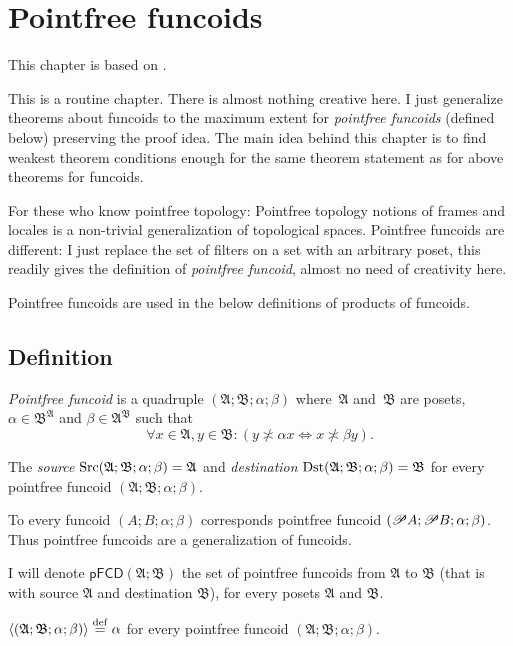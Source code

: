 
\chapter{\label{pf-funcoids}Pointfree funcoids}

This chapter is based on \cite{pointfree}.

This is a routine chapter. There is almost nothing creative here.
I just generalize theorems about funcoids to the maximum extent for
\emph{pointfree funcoids} (defined below) preserving the proof idea.
The main idea behind this chapter is to find weakest theorem conditions
enough for the same theorem statement as for above theorems for funcoids.

For these who know pointfree topology: Pointfree topology notions
of frames and locales is a non-trivial generalization of topological
spaces. Pointfree funcoids are different: I just replace the set of
filters on a set with an arbitrary poset, this readily gives the definition
of \emph{pointfree funcoid}, almost no need of creativity here.

Pointfree funcoids are used in the below definitions of products of
funcoids.


\section{Definition}
\begin{defn}
\emph{Pointfree funcoid} is a quadruple
$(\mathfrak{A};\mathfrak{B};\alpha;\beta)$ where~$\mathfrak{A}$
and~$\mathfrak{B}$ are posets, $\alpha\in\mathfrak{B}^{\mathfrak{A}}$
and $\beta\in\mathfrak{A}^{\mathfrak{B}}$ such that 
\[
\forall x\in\mathfrak{A},y\in\mathfrak{B}:(y\nasymp\alpha x\Leftrightarrow x\nasymp\beta y).
\]

\end{defn}

\begin{defn}
The
\emph{source} $\operatorname{Src}(\mathfrak{A};\mathfrak{B};\alpha;\beta)=\mathfrak{A}$
and \emph{destination} $\operatorname{Dst}(\mathfrak{A};\mathfrak{B};\alpha;\beta)=\mathfrak{B}$
for every pointfree funcoid $(\mathfrak{A};\mathfrak{B};\alpha;\beta)$.
\end{defn}
To every funcoid $(A;B;\alpha;\beta)$ corresponds pointfree funcoid
$(\mathscr{P} A;\mathscr{P} B;\alpha;\beta)$. Thus pointfree funcoids are
a generalization of funcoids.
\begin{defn}
I will denote $\mathsf{pFCD}(\mathfrak{A};\mathfrak{B})$ the set
of pointfree funcoids from $\mathfrak{A}$ to $\mathfrak{B}$ (that
is with source $\mathfrak{A}$ and destination $\mathfrak{B}$), for
every posets $\mathfrak{A}$ and $\mathfrak{B}$.

$\left\langle (\mathfrak{A};\mathfrak{B};\alpha;\beta)\right\rangle\overset{\mathrm{def}}{=}\alpha$ for
every pointfree funcoid $(\mathfrak{A};\mathfrak{B};\alpha;\beta)$.
\end{defn}


